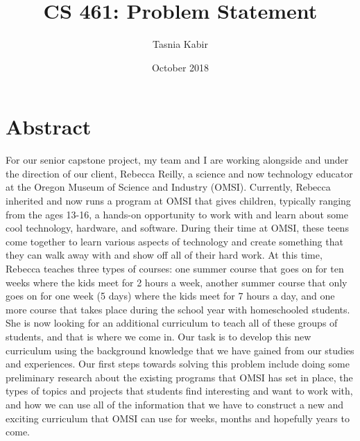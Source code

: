 \documentclass{article}
\title{CS 461: Problem Statement}
\author{Tasnia Kabir}
\date{October 2018}
\begin{document}
\maketitle

\section{Abstract}
For our senior capstone project, my team and I are working alongside and under the direction of our client, Rebecca Reilly, a science and now technology educator at the Oregon Museum of Science and Industry (OMSI). Currently, Rebecca inherited and now runs a program at OMSI that gives children, typically ranging from the ages 13-16, a hands-on opportunity to work with and learn about some cool technology, hardware, and software. During their time at OMSI, these teens come together to learn various aspects of technology and create something that they can walk away with and show off all of their hard work. At this time, Rebecca teaches three types of courses: one summer course that goes on for ten weeks where the kids meet for 2 hours a week, another summer course that only goes on for one week (5 days) where the kids meet for 7 hours a day, and one more course that takes place during the school year with homeschooled students. She is now looking for an additional curriculum to teach all of these groups of students, and that is where we come in. Our task is to develop this new curriculum using the background knowledge that we have gained from our studies and experiences. Our first steps towards solving this problem include doing some preliminary research about the existing programs that OMSI has set in place, the types of topics and projects that students find interesting and want to work with, and how we can use all of the information that we have to construct a new and exciting curriculum that OMSI can use for weeks, months and hopefully years to come.
\end{document}
